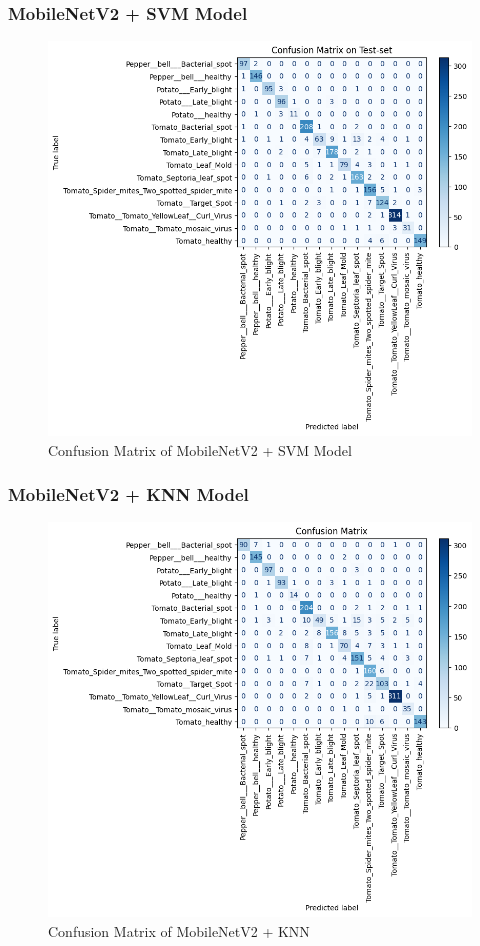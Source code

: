 \subsubsection{MobileNetV2 + SVM Model}

\begin{figure}
    \centering
    \includegraphics[width=1\linewidth]{graphics//chapter6/cm SVM.png}
    \caption{Confusion Matrix of MobileNetV2 + SVM Model}
    \label{fig:cm-svm}
\end{figure}
\subsubsection{MobileNetV2 + KNN Model}
\begin{figure}
    \centering
    \includegraphics[width=1\linewidth]{graphics//chapter6/cm knn.png}
    \caption{Confusion Matrix of MobileNetV2 + KNN}
    \label{fig:cm-knn}
\end{figure}

